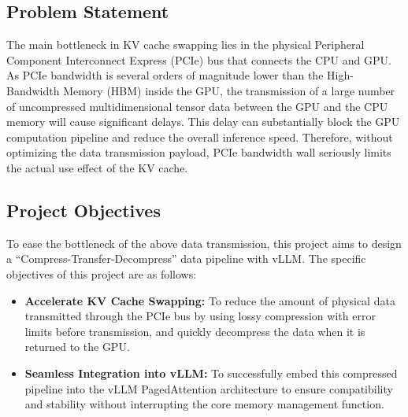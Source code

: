 \documentclass{polyu-comp}
\begin{document}
\subsection{Problem Statement}
The main bottleneck \cite{8763922} in KV cache swapping lies in the physical Peripheral Component Interconnect Express (PCIe) bus that connects the CPU and GPU. As PCIe bandwidth is several orders of magnitude lower than the High-Bandwidth Memory (HBM) inside the GPU, the transmission of a large number of uncompressed multidimensional tensor data between the GPU and the CPU memory will cause significant delays. This delay can substantially block the GPU computation pipeline and reduce the overall inference speed. Therefore, without optimizing the data transmission payload, PCIe bandwidth wall seriously limits the actual use effect of the KV cache.

\subsection{Project Objectives}
To ease the bottleneck of the above data transmission, this project aims to design a ``Compress-Transfer-Decompress'' data pipeline with vLLM. The specific objectives of this project are as follows:
\begin{itemize}
    \item \textbf{Accelerate KV Cache Swapping:} To reduce the amount of physical data transmitted through the PCIe bus by using lossy compression with error limits before transmission, and quickly decompress the data when it is returned to the GPU.
    \item \textbf{Seamless Integration into vLLM:} To successfully embed this compressed pipeline into the vLLM PagedAttention architecture to ensure compatibility and stability without interrupting the core memory management function.
\end{itemize}
\end{document}
